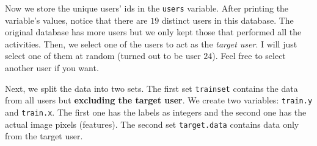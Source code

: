 \documentclass[
  11pt,
]{krantz}
\newenvironment{Shaded}{\begin{snugshade}}{\end{snugshade}}
\newcommand{\CommentTok}[1]{\textcolor[rgb]{0.37,0.37,0.37}{\textit{#1}}}
\newcommand{\DecValTok}[1]{\textcolor[rgb]{0.06,0.06,0.06}{#1}}
\newcommand{\FunctionTok}[1]{\textcolor[rgb]{0,0,0}{#1}}
\newcommand{\NormalTok}[1]{#1}
\newcommand{\OtherTok}[1]{\textcolor[rgb]{0.37,0.37,0.37}{#1}}
\newcommand{\SpecialCharTok}[1]{\textcolor[rgb]{0,0,0}{#1}}
\begin{document}
Now we store the unique users' ids in the \texttt{users} variable. After printing the variable's values, notice that there are \(19\) distinct users in this database. The original database has more users but we only kept those that performed all the activities. Then, we select one of the users to act as the \emph{target user}. I will just select one of them at random (turned out to be user \(24\)). Feel free to select another user if you want.

\begin{Shaded}
\end{Shaded}

Next, we split the data into two sets. The first set \texttt{trainset} contains the data from all users but \textbf{excluding the target user}. We create two variables: \texttt{train.y} and \texttt{train.x}. The first one has the labels as integers and the second one has the actual image pixels (features). The second set \texttt{target.data} contains data only from the target user.

\begin{Shaded}
\end{Shaded}
\end{document}
